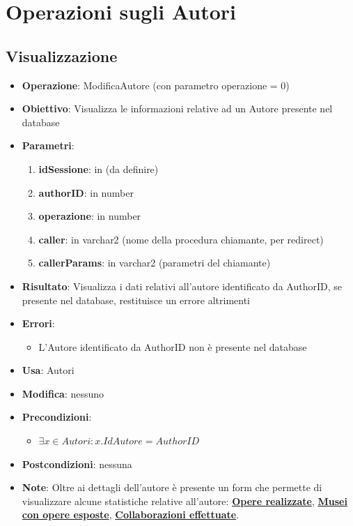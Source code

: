 \section{Operazioni sugli Autori}

\subsection{Visualizzazione}
\begin{itemize}
	\item \textbf{Operazione}: ModificaAutore (con parametro operazione = 0)
	\item \textbf{Obiettivo}: Visualizza le informazioni relative ad un Autore presente nel database
	\item \textbf{Parametri}:
	\begin{enumerate}
		\item \textbf{idSessione}: in (da definire)
		\item \textbf{authorID}: in number
		\item \textbf{operazione}: in number
		\item \textbf{caller}: in varchar2 (nome della procedura chiamante, per redirect)
		\item \textbf{callerParams}: in varchar2 (parametri del chiamante)
	\end{enumerate}
	\item \textbf{Risultato}: Visualizza i dati relativi all'autore identificato da AuthorID, se presente nel database, restituisce un errore altrimenti
	\item \textbf{Errori}: 
	\begin{itemize}
		\item L'Autore identificato da AuthorID non è presente nel database
	\end{itemize}
	\item \textbf{Usa}: Autori
	\item \textbf{Modifica}: nessuno
	\item \textbf{Precondizioni}:
	\begin{itemize}
		\item $\exists x \in Autori : x.IdAutore = AuthorID$
	\end{itemize}
	\item \textbf{Postcondizioni}: nessuna
	\item \textbf{Note}: Oltre ai dettagli dell'autore è presente un form che permette di 
	visualizzare alcune statistiche relative all'autore:  \hyperref[OpereRealizzate]{\textbf{Opere realizzate}}, 
	\hyperref[MuseiOpereEsposte]{\textbf{Musei con opere esposte}},
	\hyperref[Collaborazioni]{\textbf{Collaborazioni effettuate}}.
\end{itemize}

